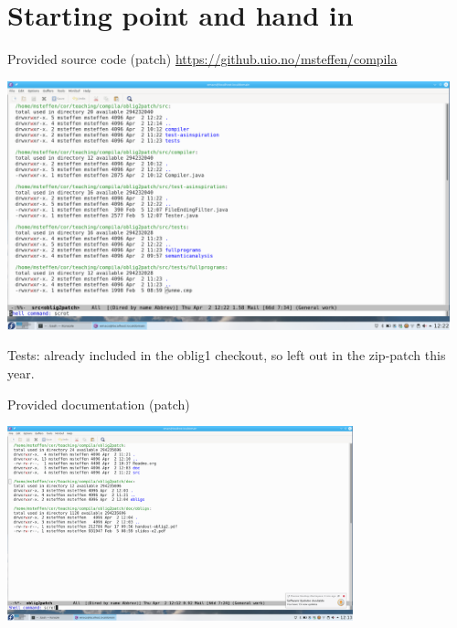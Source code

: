 \documentclass{beamer}
\begin{document}
\section{Starting point and hand in}
\label{sec:org6bbe382}
\begin{frame}[label={sec:org6576fb7}]{Provided source code (patch)}
\url{https://github.uio.no/msteffen/compila}

\includegraphics[width=0.96\textwidth]{figures/snaps/directorystructure-src}

Tests: already included in the oblig1 checkout, so left out in the zip-patch
this year.
\end{frame}
\begin{frame}[label={sec:orgf6d1d71}]{Provided documentation (patch)}

\begin{center}
 \includegraphics[width=0.75\textwidth]{figures/snaps/directorystructure-doc}
\end{center}
\end{frame}
\end{document}

